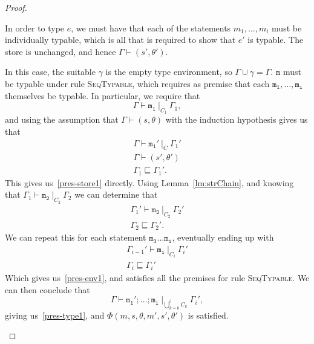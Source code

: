 \begin{proof}
  \begin{case}[Seq1]
	In order to type $e$, we must have that each of the statements $m_1,\dots,m_i$ must
	be individually typable, which is all that is required to show that $e'$ 
	is typable. The store is unchanged, and hence $\Gamma\vdash(s',\theta')$.
  \end{case}
  \begin{case}[Seq2]
	In this case, the suitable $\gamma$ is the empty type environment, so 
	$\Gamma\!\cup\!\gamma=\Gamma$. $\mathtt{m}$ must
	be typable under rule \textsc{SeqTypable}, which requires as premise that
	each $\mathtt{m_1}, \dots, \mathtt{m_i}$ themselves be typable. In particular, we
	require that 
	$$\Gamma\vdash\mathtt{m_1}\ |_{C_1}\ \Gamma_1,$$ 
	and using the assumption that $\Gamma\vdash(s,\theta)$ with the induction hypothesis gives us that
	\begin{gather*}
	  \Gamma\vdash\mathtt{m_1'}\ |_{C}\ \Gamma_1' \\
	  \Gamma\vdash(s',\theta') \\
	  \Gamma_1\sqsubseteq\Gamma_1'.
  	\end{gather*}
  	This gives us~\eqref{pres-store1} directly. Using
	Lemma~\ref{lm:strChain}, and knowing that $\Gamma_1\vdash\mathtt{m_2}\ |_{C_2}\ \Gamma_2$
   	we can determine that 
	\begin{gather*}
	  \Gamma_1'\vdash\mathtt{m_2}\ |_{C_2}\ \Gamma_2' \\
	  \Gamma_2\sqsubseteq\Gamma_2'.
  	\end{gather*}
	We can repeat this for each statement $\mathtt{m_3\dots m_i}$, eventually ending up with
	\begin{gather*}
	  \Gamma_{i-1}'\vdash\mathtt{m_i}\ |_{C_i}\ \Gamma_i' \\
	  \Gamma_i\sqsubseteq\Gamma_i'
	\end{gather*}
	Which gives us~\eqref{pres-env1}, and satisfies all the premises for rule
	\textsc{SeqTypable}. We can then conclude that 
	$$\Gamma\vdash\mathtt{m_1'; \dots; m_i}\ |_{\bigcup_{k=0}^i{C_k}}\ \Gamma_i',$$
	giving us~\eqref{pres-type1}, and $\Phi(m,s,\theta,m',s',\theta')$ is satisfied.

  \end{case}
  

\end{proof}

